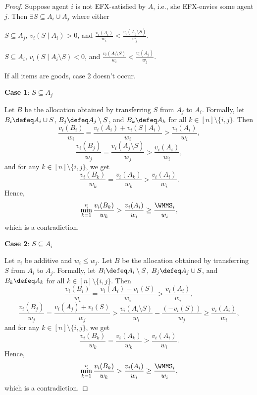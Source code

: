 \begin{proof}
Suppose agent $i$ is not EFX-satisfied by $A$, i.e., she EFX-envies some agent $j$.
Then $\exists S \subseteq A_i \cup A_j$ where either

\begin{tightenum}
\item $S \subseteq A_j$, $v_i(S \mid A_i) > 0$, and
    $\displaystyle \frac{v_i(A_i)}{w_i} < \frac{v_i(A_j \setminus S)}{w_j}$.
\item $S \subseteq A_i$, $v_i(S \mid A_i \setminus S) < 0$, and
    $\displaystyle \frac{v_i(A_i \setminus S)}{w_i} < \frac{v_i(A_j)}{w_j}$.
\end{tightenum}

If all items are goods, case 2 doesn't occur.

\textbf{Case 1}: $S \subseteq A_j$

Let $B$ be the allocation obtained by transferring $S$ from $A_j$ to $A_i$.
Formally, let $B_i \defeq A_i \cup S$, $B_j \defeq A_j \setminus S$,
and $B_k \defeq A_k$ for all $k \in [n] \setminus \{i, j\}$. Then
\[ \frac{v_i(B_i)}{w_i} = \frac{v_i(A_i) + v_i(S \mid A_i)}{w_i} > \frac{v_i(A_i)}{w_i}, \]
\[ \frac{v_i(B_j)}{w_j} = \frac{v_i(A_j \setminus S)}{w_j} > \frac{v_i(A_i)}{w_i}, \]
and for any $k \in [n] \setminus \{i, j\}$, we get
\[ \frac{v_i(B_k)}{w_k} = \frac{v_i(A_k)}{w_k} > \frac{v_i(A_i)}{w_i}. \]
Hence,
\[ \min_{k=1}^n \frac{v_i(B_k)}{w_k} > \frac{v_i(A_i)}{w_i} \ge \frac{\WMMS_i}{w_i}, \]
which is a contradiction.

\textbf{Case 2}: $S \subseteq A_i$

Let $v_i$ be additive and $w_i \le w_j$.
Let $B$ be the allocation obtained by transferring $S$ from $A_i$ to $A_j$. Formally,
let $B_i \defeq A_i \setminus S$, $B_j \defeq A_j \cup S$,
and $B_k \defeq A_k$ for all $k \in [n] \setminus \{i, j\}$. Then
\[ \frac{v_i(B_i)}{w_i} = \frac{v_i(A_i) - v_i(S)}{w_i} > \frac{v_i(A_i)}{w_i}, \]
\[ \frac{v_i(B_j)}{w_j} = \frac{v_i(A_j) + v_i(S)}{w_j} > \frac{v_i(A_i \setminus S)}{w_i} - \frac{(-v_i(S))}{w_j} \ge \frac{v_i(A_i)}{w_i}, \]
and for any $k \in [n] \setminus \{i, j\}$, we get
\[ \frac{v_i(B_k)}{w_k} = \frac{v_i(A_k)}{w_k} > \frac{v_i(A_i)}{w_i}. \]
Hence,
\[ \min_{k=1}^n \frac{v_i(B_k)}{w_k} > \frac{v_i(A_i)}{w_i} \ge \frac{\WMMS_i}{w_i}, \]
which is a contradiction.
\end{proof}

